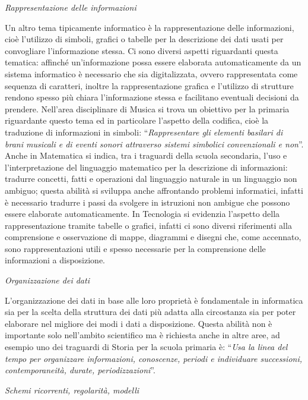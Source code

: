 \documentclass[12pt]{report}
\begin{document}
\bigskip
\textit{Rappresentazione delle informazioni}

\noindent Un altro tema tipicamente informatico è la rappresentazione delle informazioni, cioè l'utilizzo di simboli, grafici o tabelle per la descrizione dei dati usati per convogliare l'informazione stessa. Ci sono diversi aspetti riguardanti questa tematica: affinché un'informazione possa essere elaborata automaticamente da un sistema informatico è necessario che sia digitalizzata, ovvero rappresentata come sequenza di caratteri, inoltre la rappresentazione grafica e l'utilizzo di strutture rendono spesso più chiara l'informazione stessa e facilitano eventuali decisioni da prendere.
Nell'area disciplinare di Musica si trova un obiettivo per la primaria riguardante questo tema ed in particolare l'aspetto della codifica, cioè la traduzione di informazioni in simboli: ``\textit{Rappresentare gli elementi basilari di brani musicali e di eventi sonori attraverso sistemi simbolici convenzionali e non}''.
Anche in Matematica si indica, tra i traguardi della scuola secondaria, l'uso e l'interpretazione del linguaggio matematico per la descrizione di informazioni: tradurre concetti, fatti e operazioni dal linguaggio naturale in un linguaggio non ambiguo; questa abilità si sviluppa anche affrontando problemi informatici, infatti è necessario tradurre i passi da svolgere in istruzioni non ambigue che possono essere elaborate automaticamente.  In Tecnologia si evidenzia l'aspetto della rappresentazione tramite tabelle o grafici, infatti ci sono diversi riferimenti alla comprensione e osservazione di mappe, diagrammi e disegni che, come accennato, sono rappresentazioni utili e spesso necessarie per la comprensione delle informazioni a disposizione.

\bigskip
\textit{Organizzazione dei dati}

\noindent L'organizzazione dei dati in base alle loro proprietà è fondamentale in informatica sia per la scelta della struttura dei dati più adatta alla circostanza sia per poter elaborare nel migliore dei modi i dati a disposizione. Questa abilità non è importante solo nell'ambito scientifico ma è richiesta anche in altre aree, ad esempio uno dei traguardi di Storia per la scuola primaria è: ``\textit{Usa la linea del tempo per organizzare informazioni, conoscenze, periodi e individuare successioni, contemporaneità, durate, periodizzazioni}''.

\bigskip
\textit{Schemi ricorrenti, regolarità, modelli}
\end{document}

